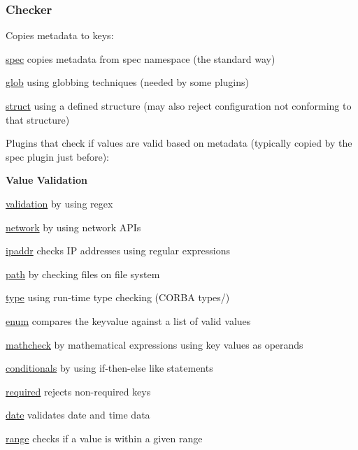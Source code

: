 \subsubsection*{Checker}

Copies metadata to keys\+:


\begin{DoxyItemize}
\item \hyperlink{md_src_plugins_spec_README_src_plugins_spec_README_md}{spec} copies metadata from spec namespace (the standard way)
\item \hyperlink{md_src_plugins_glob_README_src_plugins_glob_README_md}{glob} using globbing techniques (needed by some plugins)
\item \hyperlink{md_src_plugins_struct_README_src_plugins_struct_README_md}{struct} using a defined structure (may also reject configuration not conforming to that structure)
\end{DoxyItemize}

Plugins that check if values are valid based on metadata (typically copied by the {\ttfamily spec} plugin just before)\+:

{\bfseries Value Validation}


\begin{DoxyItemize}
\item \hyperlink{md_src_plugins_validation_README_src_plugins_validation_README_md}{validation} by using regex
\item \hyperlink{md_src_plugins_network_README_src_plugins_network_README_md}{network} by using network A\+P\+Is
\item \hyperlink{md_src_plugins_ipaddr_README_src_plugins_ipaddr_README_md}{ipaddr} checks IP addresses using regular expressions
\item \hyperlink{md_src_plugins_path_README_src_plugins_path_README_md}{path} by checking files on file system
\item \hyperlink{md_src_plugins_type_README_src_plugins_type_README_md}{type} using run-\/time type checking (C\+O\+R\+BA types/)
\item \hyperlink{md_src_plugins_enum_README_src_plugins_enum_README_md}{enum} compares the keyvalue against a list of valid values
\item \hyperlink{md_src_plugins_mathcheck_README_src_plugins_mathcheck_README_md}{mathcheck} by mathematical expressions using key values as operands
\item \hyperlink{md_src_plugins_conditionals_README_src_plugins_conditionals_README_md}{conditionals} by using if-\/then-\/else like statements
\item \hyperlink{md_src_plugins_required_README_src_plugins_required_README_md}{required} rejects non-\/required keys
\item \hyperlink{md_src_plugins_date_README_src_plugins_date_README_md}{date} validates date and time data
\item \hyperlink{md_src_plugins_range_README_src_plugins_range_README_md}{range} checks if a value is within a given range
\end{DoxyItemize}

